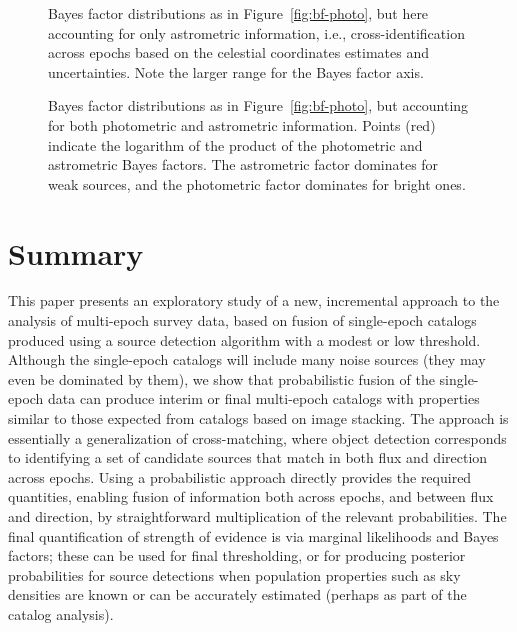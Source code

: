 \documentclass[twocolumn]{emulateapj}
\begin{document}
\begin{figure}[t!]
\caption{Bayes factor distributions as in Figure~\ref{fig:bf-photo}, but here accounting for only astrometric information, i.e., cross-identification across epochs based on the celestial coordinates estimates and uncertainties.
Note the larger range for the Bayes factor axis.}
\label{fig:bf-astro}
\end{figure}


\begin{figure}[t!]
\caption{Bayes factor distributions as in Figure~\ref{fig:bf-photo}, but accounting for both photometric and astrometric information.
Points (red) indicate the logarithm of the product of the photometric and astrometric Bayes factors.
The astrometric factor dominates for weak sources, and the photometric factor dominates for bright ones.}
\label{fig:bf-both}
\end{figure}



\color{black}


\section{Summary}
\label{sec:sum}

\noindent
This paper presents an exploratory study of a new, incremental approach to the analysis of multi-epoch survey data, based on fusion of single-epoch catalogs produced using a source detection algorithm with a modest or low threshold.
Although the single-epoch catalogs will include many noise sources (they may even be dominated by them), we show that probabilistic fusion of the single-epoch data can produce interim or final multi-epoch catalogs with properties similar to those expected from catalogs based on image stacking.
The approach is essentially a generalization of cross-matching, where object detection corresponds to identifying a set of candidate sources that match in both flux and direction across epochs.
Using a probabilistic approach directly provides the required quantities, enabling fusion of information both across epochs, and between flux and direction, by straightforward multiplication of the relevant probabilities.
The final quantification of strength of evidence is via marginal likelihoods and Bayes factors; these can be used for final thresholding, or for producing posterior probabilities for source detections when population properties such as sky densities are known or can be accurately estimated (perhaps as part of the catalog analysis).
\end{document}
